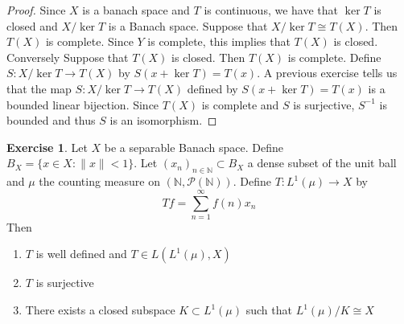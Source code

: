 \documentclass[12pt]{amsart}
\theoremstyle{definition}
\newtheorem{ex}[definition]{Exercise}
\newcommand{\N}{\mathbb{N}}
\newcommand{\MP}{\mathcal{P}}
\newcommand{\lex}[1]{\label{ex:#1}}
\begin{document}
	\begin{proof}
		Since $X$ is a banach space and $T$ is continuous, we have that $\ker T$ is closed and $X/ \ker T$ is a Banach space. Suppose that $X/ \ker T \cong T(X)$. Then $T(X)$ is complete. Since $Y$ is complete, this implies that $T(X)$ is closed. \\
		Conversely Suppose that $T(X)$ is closed. Then $T(X)$ is complete. Define $S: X/ \ker T \rightarrow T(X)$ by $S(x + \ker T) = T(x)$. A previous exercise tells us that the map $S: X/ \ker T \rightarrow T(X)$ defined by $S(x + \ker T) = T(x)$ is a bounded linear bijection. Since $T(X)$ is complete and $S$ is surjective, $S^{-1}$ is bounded and thus $S$ is an isomorphism.   
	\end{proof}
	
	\begin{ex} \lex{}
		Let $X$ be a separable Banach space. Define $B_X = \{x \in X: \|x \|< 1\}$. Let $(x_n)_{n \in \N} \subset B_X $ a dense subset of the unit ball and $\mu$ the counting measure on $(\N, \MP(\N))$. Define $T: L^1(\mu) \rightarrow X$ by $$Tf = \sum_{n=1}^{\infty}f(n)x_n$$ Then 
		\begin{enumerate}
			\item $T$ is well defined and $T \in L(L^1(\mu), X)$
			\item $T$ is surjective
			\item There exists a closed subspace $K \subset L^1(\mu)$ such that $L^1(\mu)/K \cong X$ 
		\end{enumerate} 
	\end{ex}
	
\end{document}
